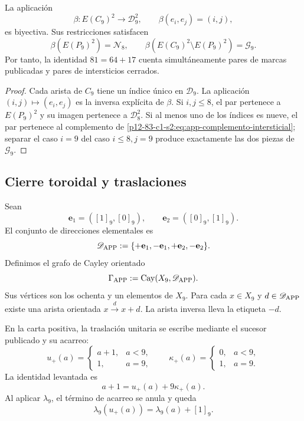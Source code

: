 \begin{theorem}
\label{p12-83-c1-s2:thm:app-equivalencia-modelos}
La aplicación
\[
 \beta:E(C_9)^2\longrightarrow\mathcal D_9^2,
 \qquad
 \beta(e_i,e_j)=(i,j),
\]
es biyectiva. Sus restricciones satisfacen
\[
 \beta(E(P_9)^2)=\mathcal N_8,
 \qquad
 \beta(E(C_9)^2\setminus E(P_9)^2)=\mathcal G_9.
\]
Por tanto, la identidad \(81=64+17\) cuenta simultáneamente pares de
marcas publicadas y pares de intersticios cerrados.
\end{theorem}

\begin{proof}
Cada arista de \(C_9\) tiene un índice único en \(\mathcal D_9\). La
aplicación \((i,j)\mapsto(e_i,e_j)\) es la inversa explícita de \(\beta\).
Si \(i,j\leq8\), el par pertenece a \(E(P_9)^2\) y su imagen pertenece a
\(\mathcal D_8^2\). Si al menos uno de los índices es nueve, el par pertenece
al complemento de \cref{p12-83-c1-s2:eq:app-complemento-intersticial}; separar el caso
\(i=9\) del caso \(i\leq8,j=9\) produce exactamente las dos piezas de
\(\mathcal G_9\).
\end{proof}

\subsection{Cierre toroidal y traslaciones}

Sean
\[
 \mathbf e_1=([1]_9,[0]_9),
 \qquad
 \mathbf e_2=([0]_9,[1]_9).
\]
El conjunto de direcciones elementales es
\[
 \mathscr D_{\rm APP}:=
 \{+\mathbf e_1,-\mathbf e_1,+\mathbf e_2,-\mathbf e_2\}.
\]
Definimos el grafo de Cayley orientado
\[
 \Gamma_{\rm APP}:=\operatorname{Cay}(X_9,\mathscr D_{\rm APP}).
\]
Sus vértices son los ochenta y un elementos de \(X_9\). Para cada
\(x\in X_9\) y \(d\in\mathscr D_{\rm APP}\) existe una arista orientada
\(x\xrightarrow{d}x+d\). La arista inversa lleva la etiqueta \(-d\).

En la carta positiva, la traslación unitaria se escribe mediante el sucesor
publicado y su acarreo:
\[
 u_+(a)=
 \begin{cases}
  a+1,&a<9,\\
  1,&a=9,
 \end{cases}
 \qquad
 \kappa_+(a)=
 \begin{cases}
  0,&a<9,\\
  1,&a=9.
 \end{cases}
\]
La identidad levantada es
\begin{equation}
 a+1=u_+(a)+9\kappa_+(a).
\label{p12-83-c1-s2:eq:app-sucesor-publicado-acarreo}
\end{equation}
Al aplicar \(\lambda_9\), el término de acarreo se anula y queda
\[
 \lambda_9(u_+(a))=\lambda_9(a)+[1]_9.
\]

